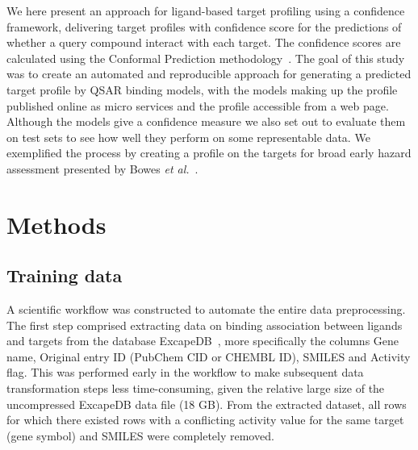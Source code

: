 \documentclass[10pt,article]{memoir}
\begin{document}
We here present an approach for ligand-based target profiling using a
confidence framework, delivering target profiles with confidence score for the
predictions of whether a query compound interact with each target. The
confidence scores are calculated using the Conformal Prediction
methodology~\cite{Vovk2005}.
%
The goal of this study was to create an automated and reproducible approach for
generating a predicted target profile by QSAR binding models, with the models
making up the profile published online as micro services and the profile
accessible from a web page. Although the models give a confidence measure we
also set out to evaluate them on test sets to see how well they perform on some
representable data. We exemplified the process by creating a profile on the
targets for broad early hazard assessment presented by Bowes \textit{et
al.}~\cite{Bowes2012}.

\section*{Methods}

\subsection{Training data}

A scientific workflow was constructed to automate the entire data
preprocessing.  The first step comprised extracting data on binding association
between ligands and targets from the database ExcapeDB~\cite{Sun2017}, more
specifically the columns Gene name, Original entry ID (PubChem CID or CHEMBL
ID), SMILES and Activity flag. This was performed early in the workflow to make
subsequent data transformation steps less time-consuming, given the relative large
size of the uncompressed ExcapeDB data file (18 GB).
%
From the extracted dataset, all rows for which there existed rows with a conflicting
activity value for the same target (gene symbol) and SMILES were completely removed.
\end{document}
